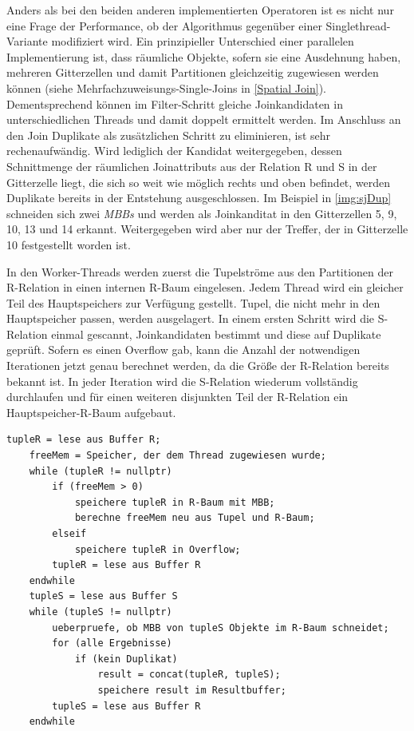 \documentclass[a4paper,12pt,twoside]{article}
\newcommand{\Fb}[1]{\textit{#1}} %
\begin{document}
Anders als bei den beiden anderen implementierten Operatoren ist es nicht nur eine Frage der Performance, ob der Algorithmus gegenüber einer Singlethread-Variante modifiziert wird. Ein prinzipieller Unterschied einer parallelen Implementierung ist, dass räumliche Objekte, sofern sie eine Ausdehnung haben, mehreren Gitterzellen und damit Partitionen gleichzeitig zugewiesen werden können (siehe Mehrfachzuweisungs-Single-Joins in \autoref{Spatial Join}). Dementsprechend können im Filter-Schritt gleiche Joinkandidaten in unterschiedlichen Threads und damit doppelt ermittelt werden. Im Anschluss an den Join Duplikate als zusätzlichen Schritt zu eliminieren, ist sehr rechenaufwändig. Wird lediglich der Kandidat weitergegeben, dessen Schnittmenge der räumlichen Joinattributs aus der Relation R und S in der Gitterzelle liegt, die sich so weit wie möglich rechts und oben befindet, werden Duplikate bereits in der Entstehung ausgeschlossen. Im Beispiel in \autoref{img:sjDup} schneiden sich zwei \Fb{MBBs} und werden als Joinkanditat in den Gitterzellen 5, 9, 10, 13 und 14 erkannt. Weitergegeben wird aber nur der Treffer, der in Gitterzelle 10 festgestellt worden ist.

In den Worker-Threads werden zuerst die Tupelströme aus den Partitionen der R-Relation in einen internen R-Baum eingelesen. Jedem Thread wird ein gleicher Teil des Hauptspeichers zur Verfügung gestellt. Tupel, die nicht mehr in den Hauptspeicher passen, werden ausgelagert. In einem ersten Schritt wird die S-Relation einmal gescannt, Joinkandidaten bestimmt und diese auf Duplikate geprüft. Sofern es einen Overflow gab, kann die Anzahl der notwendigen Iterationen jetzt genau berechnet werden, da die Größe der R-Relation bereits bekannt ist. In jeder Iteration wird die S-Relation wiederum vollständig durchlaufen und für einen weiteren disjunkten Teil der R-Relation ein Hauptspeicher-R-Baum aufgebaut.

\begin{minipage}{0.95\textwidth}
	\begin{lstlisting}[caption={Spatial-Join: Worker.}, label=list:spatialJoin]
	tupleR = lese aus Buffer R;
	freeMem = Speicher, der dem Thread zugewiesen wurde; 
	while (tupleR != nullptr)
		if (freeMem > 0)
			speichere tupleR in R-Baum mit MBB;
			berechne freeMem neu aus Tupel und R-Baum;
		elseif
			speichere tupleR in Overflow;
		tupleR = lese aus Buffer R 
	endwhile
	tupleS = lese aus Buffer S
	while (tupleS != nullptr)
		ueberpruefe, ob MBB von tupleS Objekte im R-Baum schneidet;
		for (alle Ergebnisse)
			if (kein Duplikat)
				result = concat(tupleR, tupleS);
				speichere result im Resultbuffer;
		tupleS = lese aus Buffer R
	endwhile
	\end{lstlisting}
\end{minipage}
\end{document}
